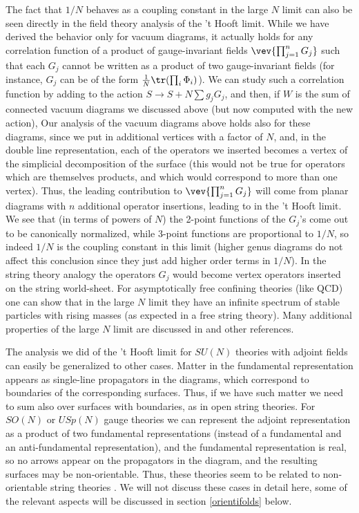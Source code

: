The fact that $1/N$ behaves as a coupling constant in the large $N$
limit can also be seen directly in the field theory analysis of the 't
Hooft limit. While we have derived the behavior  only
for vacuum diagrams, it actually holds for any correlation function of
a product of gauge-invariant fields $\vev{\prod_{j=1}^n G_j}$ such
that each $G_j$ cannot be written as a product of two gauge-invariant
fields (for instance, $G_j$ can be of the form ${1\over N}\tr(\prod_i
\Phi_i)$). We can study such a correlation function by adding to the
action $S \to S + N\sum g_j G_j$, and then, if $W$ is the sum of
connected vacuum diagrams we discussed above (but now computed with
the new action), 
Our analysis of the vacuum diagrams above holds also for these
diagrams, since we put in additional vertices with a factor of $N$,
and, in the double line representation, each of the operators we
inserted becomes a vertex of the simplicial decomposition of the
surface (this would not
be true for operators which are themselves products, and which would
correspond to more than one vertex). Thus, the leading contribution to
$\vev{\prod_{j=1}^n G_j}$ will come from planar diagrams with $n$
additional operator insertions, leading to
in the 't Hooft limit. We see that (in terms of powers of $N$) the
2-point functions of the $G_j$'s come out to be canonically
normalized, while 3-point functions are proportional to $1/N$, so
indeed $1/N$ is the coupling constant in this limit (higher genus
diagrams do not affect this conclusion since they just add higher
order terms in $1/N$). In the string theory analogy the operators
$G_j$ would become vertex operators inserted on the string
world-sheet. For asymptotically free confining theories (like QCD) one
can show that in the large $N$ limit they have an infinite spectrum of
stable particles with rising masses (as expected in a free string
theory). Many additional properties of the large $N$ limit are
discussed in
\cite{Migdal:1977nu,Coleman:1980nk} and other references.

The analysis we did of the 't Hooft limit for $SU(N)$ theories with
adjoint fields can easily be generalized to other cases. Matter in the
fundamental representation appears as single-line propagators in the
diagrams, which correspond to boundaries of the corresponding
surfaces. Thus, if we have such matter we need to sum also over
surfaces with boundaries, as in open string theories. For $SO(N)$ or
$USp(N)$ gauge theories we can represent the adjoint representation as
a product of two fundamental representations (instead of a fundamental
and an anti-fundamental representation), and the fundamental
representation is real, so no arrows appear on the propagators in the
diagram, and the resulting surfaces may be non-orientable. Thus, these
theories seem to be related to non-orientable string theories
\cite{Cicuta:1982fu}. We will not discuss these cases in detail here,
some of the relevant aspects will be discussed in section
\ref{orientifolds} below.

